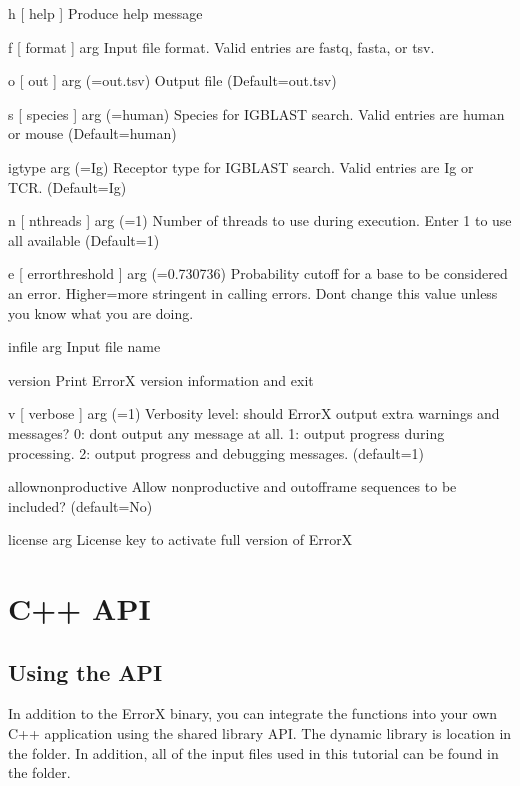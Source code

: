 \documentclass[letterpaper,10pt,english]{sphinxmanual}
\begin{document}
\begin{sphinxVerbatim}[commandchars=\\\{\}]
\PYGZhy{}h [ \PYGZhy{}\PYGZhy{}help ]					Produce help message
	
\PYGZhy{}f [ \PYGZhy{}\PYGZhy{}format ] arg				Input file format. Valid entries are fastq, fasta, or tsv.
	
\PYGZhy{}o [ \PYGZhy{}\PYGZhy{}out ] arg (=out.tsv)		Output file (Default=out.tsv)
	
\PYGZhy{}s [ \PYGZhy{}\PYGZhy{}species ] arg (=human)	Species for IGBLAST search. Valid entries are human or mouse (Default=human)
	
\PYGZhy{}\PYGZhy{}igtype arg (=Ig)				Receptor type for IGBLAST search. Valid entries are Ig or TCR. (Default=Ig)
	
\PYGZhy{}n [ \PYGZhy{}\PYGZhy{}nthreads ] arg (=\PYGZhy{}1)		Number of threads to use during execution. Enter \PYGZhy{}1 to use all available (Default=\PYGZhy{}1)
	
\PYGZhy{}e [ \PYGZhy{}\PYGZhy{}error\PYGZhy{}threshold ] arg (=0.730736)	Probability cutoff for a base to be considered an error. Higher=more stringent in calling errors. Don\PYGZsq{}t change this value unless you know what you are doing.
	
\PYGZhy{}\PYGZhy{}infile arg					Input file name
	
\PYGZhy{}\PYGZhy{}version						Print ErrorX version information and exit
	
\PYGZhy{}v [ \PYGZhy{}\PYGZhy{}verbose ] arg (=1)		Verbosity level: should ErrorX output extra warnings and messages? 0: don\PYGZsq{}t output any message at all. 1: output progress during processing. 2: output progress and debugging messages. (default=1)
	
\PYGZhy{}\PYGZhy{}allow\PYGZhy{}nonproductive			Allow nonproductive and out\PYGZhy{}of\PYGZhy{}frame sequences to be included? (default=No)
	
 \PYGZhy{}\PYGZhy{}license arg					License key to activate full version of ErrorX
\end{sphinxVerbatim}


\chapter{C++ API}
\label{\detokenize{index:c-api}}

\section{Using the API}
\label{\detokenize{index:using-the-api}}
In addition to the ErrorX binary, you can integrate the functions into your own C++ application using the shared library API. The dynamic library is location in the  folder. In addition, all of the input files used in this tutorial can be found in the  folder.
\end{document}

